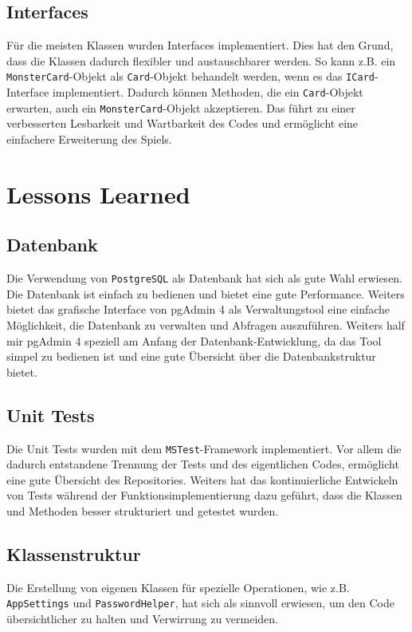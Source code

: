 \documentclass[a4paper, 12pt]{article}
\begin{document}
\subsection{Interfaces}
Für die meisten Klassen wurden Interfaces implementiert. Dies hat den Grund, dass die Klassen dadurch flexibler und austauschbarer werden. 
So kann z.B. ein \texttt{MonsterCard}-Objekt als \texttt{Card}-Objekt behandelt werden, wenn es das \texttt{ICard}-Interface implementiert. 
Dadurch können Methoden, die ein \texttt{Card}-Objekt erwarten, auch ein \texttt{MonsterCard}-Objekt akzeptieren.
Das führt zu einer verbesserten Lesbarkeit und Wartbarkeit des Codes und ermöglicht eine einfachere Erweiterung des Spiels.

\section{Lessons Learned}
\subsection{Datenbank}
Die Verwendung von \texttt{PostgreSQL} als Datenbank hat sich als gute Wahl erwiesen. Die Datenbank ist einfach zu bedienen und bietet eine gute Performance.
Weiters bietet das grafische Interface von pgAdmin 4 als Verwaltungstool eine einfache Möglichkeit, die Datenbank zu verwalten und Abfragen auszuführen.
Weiters half mir pgAdmin 4 speziell am Anfang der Datenbank-Entwicklung, da das Tool simpel zu bedienen ist und eine gute Übersicht über die Datenbankstruktur bietet.

\subsection{Unit Tests}
Die Unit Tests wurden mit dem \texttt{MSTest}-Framework implementiert. Vor allem die dadurch entstandene Trennung der Tests und des eigentlichen Codes, ermöglicht eine gute Übersicht des Repositories.
Weiters hat das kontinuierliche Entwickeln von Tests während der Funktionsimplementierung dazu geführt, dass die Klassen und Methoden besser strukturiert und getestet wurden.

\subsection{Klassenstruktur}
Die Erstellung von eigenen Klassen für spezielle Operationen, wie z.B. \texttt{AppSettings} und \texttt{PasswordHelper}, hat sich als sinnvoll erwiesen, um den Code übersichtlicher zu halten und Verwirrung zu vermeiden.
\end{document}
